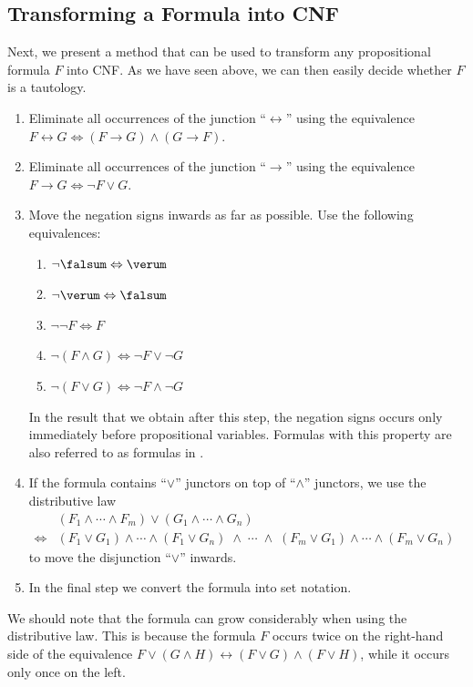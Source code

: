 \subsection{Transforming a Formula into CNF}
Next, we present a method that can be used to transform any propositional formula $F$ into CNF.  As we have
seen above, we can then easily decide whether $F$ is a tautology. 
\begin{enumerate}
\item Eliminate all occurrences of the junction ``$\leftrightarrow$'' using the equivalence \\[0.2cm]
      \hspace*{1.3cm} 
      $F \leftrightarrow G \Leftrightarrow (F \rightarrow G) \wedge (G \rightarrow F)$.
\item Eliminate all occurrences of the junction ``$\rightarrow$'' using the equivalence \\[0.2cm]
      \hspace*{1.3cm} 
      $F \rightarrow G \Leftrightarrow \neg F \vee G$.
\item Move the negation signs inwards as far as possible.  Use the following equivalences:
      \begin{enumerate}
      \item $\neg \falsum \Leftrightarrow \verum$
      \item $\neg \verum \Leftrightarrow \falsum$
      \item $\neg \neg F \Leftrightarrow F$
      \item $\neg (F \wedge G) \Leftrightarrow \neg F \vee \neg G$ 
      \item $\neg (F \vee G) \Leftrightarrow \neg F \wedge \neg G$ 
      \end{enumerate}
      In the result that we obtain after this step, the negation signs
      occurs only immediately before propositional variables.  Formulas with this
      property are also referred to as formulas in .
\item If the formula contains ``$\vee$'' junctors on top of ``$\wedge$'' junctors, we use the distributive law \\[0.2cm]
      \hspace*{1.3cm} 
      $
      \begin{array}{cl}
                      & (F_1 \wedge \cdots \wedge F_m) \vee (G_1 \wedge \cdots \wedge G_n) \\[0.2cm]
      \Leftrightarrow & (F_1 \vee G_1) \wedge \cdots \wedge (F_1 \vee G_n) \;\wedge \;\cdots\; \wedge\;
                        (F_m \vee G_1) \wedge \cdots \wedge (F_m \vee G_n)
      \end{array}
      $
      \\[0.2cm]
      to move the disjunction ``$\vee$'' inwards.
\item In the final step we convert the formula into set notation.
\end{enumerate}
We should note that the formula can grow considerably when using the distributive law.
This is because the formula $F$ occurs twice on the right-hand side of the equivalence 
$F \vee (G \wedge H) \leftrightarrow (F \vee G) \wedge (F \vee H)$, while it occurs only once on the left. 

